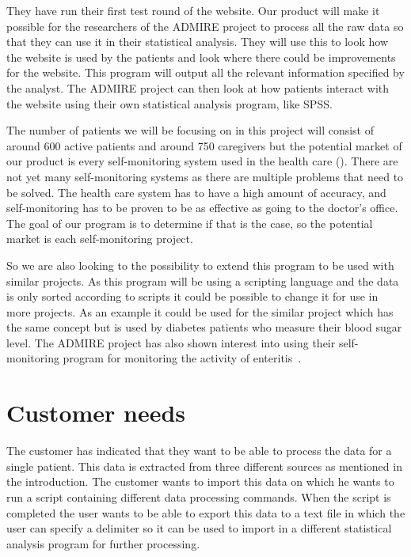 \documentclass[11pt,twoside,a4paper]{article}
\begin{document}
They have run their first test round of the website.
Our product will make it possible for the researchers of the ADMIRE project to process all the raw data so that they can use it in their statistical analysis. They will use this to look how the website is used by the patients and look where there could be improvements for the website. This program will output all the relevant information specified by the analyst. The ADMIRE project can then look at how patients interact with the website using their own statistical analysis program, like SPSS. 

The number of patients we will be focusing on in this project will consist of around 600 active patients and around 750 caregivers but
the potential market of our product is every self-monitoring system used in the health care (\cite{INTERVIEW}). There are not yet many self-monitoring systems as there are multiple problems that need to be solved. The health care system has to have a high amount of accuracy, and self-monitoring has to be proven to be as effective as going to the doctor's office. The goal of our program is to determine if that is the case, so the potential market is each self-monitoring project. 

So we are also looking to the possibility to extend this program to be used with similar projects. As this program will be using a scripting language and the data is only sorted according to scripts it could be possible to change it for use in more projects. As an example it could be used for the similar project which has the same concept but is used by diabetes patients who measure their blood sugar level. The ADMIRE project has also shown interest into using their self-monitoring program for monitoring the activity of enteritis~\autocite{ZMNF}. 


\section{Customer needs}

The customer has indicated that they want to be able to process the data for a single patient. This data is extracted from three different sources as mentioned in the introduction. The customer wants to import this data on which he wants to run a script containing different data processing commands. When the script is completed the user wants to be able to export this data to a text file in which the user can specify a delimiter so it can be used to import in a different statistical analysis program for further processing. 
\end{document}

